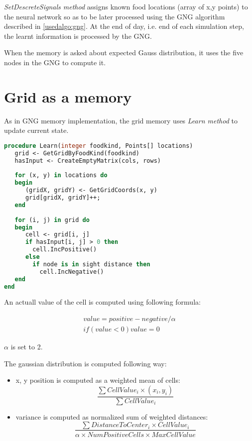 \emph{SetDescreteSignals method} assigns known food locations (array of x,y points) to the neural network so as to be later processed using the GNG algorithm described in \ref{usedalgo:gng}. At the end of day, i.e. end of each simulation step, the learnt information is processed by the GNG.

When the memory is asked about expected Gauss distribution, it uses the five nodes in the GNG to compute it.

\section{Grid as a memory}

As in GNG memory implementation, the grid memory uses \emph{Learn method} to update current state. 

\begin{lstlisting}[language=Pascal]
procedure Learn(integer foodkind, Points[] locations)
   grid <- GetGridByFoodKind(foodkind)
   hasInput <- CreateEmptyMatrix(cols, rows)
   
   for (x, y) in locations do
   begin
      (gridX, gridY) <- GetGridCoords(x, y)
      grid[gridX, gridY]++;
   end 
   
   for (i, j) in grid do
   begin
      cell <- grid[i, j]
      if hasInput[i, j] > 0 then
        cell.IncPositive()
      else
        if node is in sight distance then
          cell.IncNegative()
   end
end
\end{lstlisting}  

An actuall value of the cell is computed using following formula:

\begin{equation}        
\begin{split}
value = positive - negative / \alpha  \\
if (value < 0) value = 0 
\end{split}
\end{equation}  

$\alpha$ is set to 2.

The gaussian distribution is computed following way:

\begin{itemize}
\item x, y position is computed as a weighted mean of cells: 
\begin{equation}
  \frac{\sum{CellValue_i\times (x_i,y_i)}}{\sum{CellValue_i}}
\end{equation}
\item variance is computed as normalized sum of weighted distances:
\begin{equation}
\frac{\sum{DistanceToCenter_i\times CellValue_i}}{\alpha\times NumPositiveCells\times MaxCellValue}
\end{equation}
\end{itemize}








                                    